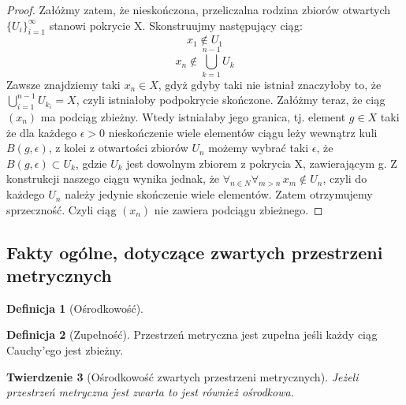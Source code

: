 \documentclass[licencjacka]{pwr_wmat_praca_dyplomowa}
\theoremstyle{plain}
\newtheorem{theorem}{Twierdzenie}
\numberwithin{theorem}{chapter}
\theoremstyle{definition}
\numberwithin{theorem}{chapter}
\newtheorem{definition}[theorem]{Definicja}
\begin{document}
\begin{proof}
Załóżmy zatem, że nieskończona, przeliczalna rodzina zbiorów otwartych $\{U_i\}_{i=1}^{\infty}$ stanowi pokrycie X. Skonstruujmy następujący ciąg: 
$$x_1 \notin U_1$$
$$x_n \notin \bigcup_{k=1}^{n-1} U_k$$ Zawsze znajdziemy taki $x_n \in X$, gdyż gdyby taki nie istniał znaczyłoby to, że $\bigcup_{i=1}^{n-1}{U_{k_i}} = X$, czyli istniałoby podpokrycie skończone. Załóżmy teraz, że ciąg $(x_n)$ ma podciąg zbieżny. Wtedy istniałaby jego granica, tj. element $g \in X$ taki że dla każdego $\epsilon > 0$ nieskończenie wiele elementów ciągu leży wewnątrz kuli $B(g, \epsilon)$, z kolei z otwartości zbiorów $U_n$ możemy wybrać taki $\epsilon$, że $B(g, \epsilon) \subset U_k$, gdzie $U_k$ jest dowolnym zbiorem z pokrycia X, zawierającym g. Z konstrukcji naszego ciągu wynika jednak, że $\forall_{n \in N} \forall_{m>n} \, x_m \notin U_n$, czyli do każdego $U_n$ należy jedynie skończenie wiele elementów. Zatem otrzymujemy sprzeczność. Czyli ciąg $(x_n)$ nie zawiera podciągu zbieżnego.
\end{proof}


\subsection{Fakty ogólne, dotyczące zwartych przestrzeni metrycznych}


\begin{definition}[Ośrodkowość]
\end{definition}


\begin{definition}[Zupełność]
Przestrzeń metryczna jest zupełna jeśli każdy ciąg Cauchy'ego jest zbieżny.
\end{definition}


\begin{theorem}[Ośrodkowość zwartych przestrzeni metrycznych] \label{zwarta_jest_osrodkowa}
Jeżeli przestrzeń metryczna jest zwarta to jest również ośrodkowa.
\end{theorem}
\end{document}
